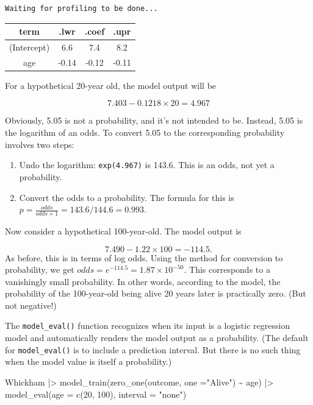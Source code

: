 \documentclass[
  letterpaper,
  DIV=11,
  numbers=noendperiod,
  oneside]{scrartcl}
\newenvironment{Shaded}{\begin{snugshade}}{\end{snugshade}}
\newcommand{\AttributeTok}[1]{\textcolor[rgb]{0.40,0.45,0.13}{#1}}
\newcommand{\DecValTok}[1]{\textcolor[rgb]{0.68,0.00,0.00}{#1}}
\newcommand{\FunctionTok}[1]{\textcolor[rgb]{0.28,0.35,0.67}{#1}}
\newcommand{\NormalTok}[1]{\textcolor[rgb]{0.00,0.23,0.31}{#1}}
\newcommand{\SpecialCharTok}[1]{\textcolor[rgb]{0.37,0.37,0.37}{#1}}
\newcommand{\StringTok}[1]{\textcolor[rgb]{0.13,0.47,0.30}{#1}}
\providecommand{\tightlist}{%
  \setlength{\itemsep}{0pt}\setlength{\parskip}{0pt}}\usepackage{longtable,booktabs,array}
\begin{document}
\begin{verbatim}
Waiting for profiling to be done...
\end{verbatim}

\begin{longtable}[]{@{}cccc@{}}
\toprule\noalign{}
term & .lwr & .coef & .upr \\
\midrule\noalign{}
\endhead
\bottomrule\noalign{}
\endlastfoot
(Intercept) & 6.6 & 7.4 & 8.2 \\
age & -0.14 & -0.12 & -0.11 \\
\end{longtable}

For a hypothetical 20-year old, the model output will be

\[7.403 - 0.1218\times 20 = 4.967\]

Obviously, 5.05 is not a probability, and it's not intended to be.
Instead, 5.05 is the logarithm of an odds. To convert 5.05 to the
corresponding probability involves two steps:

\begin{enumerate}
\def\labelenumi{\arabic{enumi})}
\tightlist
\item
  Undo the logarithm: \texttt{exp(4.967)} is 143.6. This is an odds, not
  yet a probability.
\item
  Convert the odds to a probability. The formula for this is
  \(p = \frac{odds}{odds+1} = 143.6 / 144.6 = 0.993\).
\end{enumerate}

Now consider a hypothetical 100-year-old. The model output is

\[7.490 - 1.22 \times 100 = -114.5 .\] As before, this is in terms of
log odds. Using the method for conversion to probability, we get
\(odds = e^{-114.5} = 1.87 \times 10^{-50}\). This corresponds to a
vanishingly small probability. In other words, according to the model,
the probability of the 100-year-old being alive 20 years later is
practically zero. (But not negative!)

The \texttt{model\_eval()} function recognizes when its input is a
logistic regression model and automatically renders the model output as
a probability. (The default for \texttt{model\_eval()} is to include a
prediction interval. But there is no such thing when the model value is
itself a probability.)

\begin{Shaded}
\begin{Highlighting}[]
\NormalTok{Whickham }\SpecialCharTok{|\textgreater{}} 
  \FunctionTok{model\_train}\NormalTok{(}\FunctionTok{zero\_one}\NormalTok{(outcome, }\AttributeTok{one =}\StringTok{"Alive"}\NormalTok{) }\SpecialCharTok{\textasciitilde{}}\NormalTok{ age) }\SpecialCharTok{|\textgreater{}}
  \FunctionTok{model\_eval}\NormalTok{(}\AttributeTok{age =} \FunctionTok{c}\NormalTok{(}\DecValTok{20}\NormalTok{, }\DecValTok{100}\NormalTok{), }\AttributeTok{interval =} \StringTok{"none"}\NormalTok{)}
\end{Highlighting}
\end{Shaded}
\end{document}
